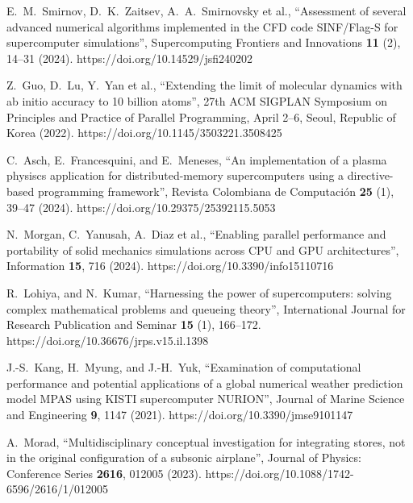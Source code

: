 \documentclass[
11pt,%
tightenlines,%
twoside,%
onecolumn,%
nofloats,%
nobibnotes,%
nofootinbib,%
superscriptaddress,%
noshowpacs,%
centertags]%
{revtex4}
\begin{document}
\begin{thebibliography}{99}

E.~M.~Smirnov, D.~K.~Zaitsev, A.~A.~Smirnovsky et al., \textquotedblleft Assessment of several advanced numerical algorithms implemented in the CFD code SINF/Flag-S for supercomputer simulations\textquotedblright, Supercomputing Frontiers and Innovations \textbf{11} (2), 14--31 (2024). https://doi.org/10.14529/jsfi240202

Z.~Guo, D.~Lu, Y.~Yan et al., \textquotedblleft Extending the limit of molecular dynamics with ab initio accuracy to 10 billion atoms\textquotedblright, 27th ACM SIGPLAN Symposium on Principles and Practice of Parallel Programming, April 2--6, Seoul, Republic of Korea (2022). https://doi.org/10.1145/3503221.3508425

C.~Asch, E.~Francesquini, and E.~Meneses, \textquotedblleft An implementation of a plasma physiscs application for distributed-memory supercomputers using a directive-based programming framework\textquotedblright, Revista Colombiana de Computaci\'on \textbf{25} (1), 39--47 (2024). https://doi.org/10.29375/25392115.5053

N.~Morgan, C.~Yanusah, A.~Diaz et al., \textquotedblleft Enabling parallel performance and portability of solid mechanics simulations across CPU and GPU architectures\textquotedblright, Information \textbf{15}, 716 (2024). https://doi.org/10.3390/info15110716

R.~Lohiya, and N.~Kumar, \textquotedblleft Harnessing the power of supercomputers: solving complex mathematical problems and queueing theory\textquotedblright, International Journal for Research Publication and Seminar \textbf{15} (1), 166--172. https://doi.org/10.36676/jrps.v15.il.1398

J.-S.~Kang, H.~Myung, and J.-H.~Yuk, \textquotedblleft Examination of computational performance and potential applications of a global numerical weather prediction model MPAS using KISTI supercomputer NURION\textquotedblright, Journal of Marine Science and Engineering \textbf{9}, 1147 (2021). https://doi.org/10.3390/jmse9101147

A.~Morad, \textquotedblleft Multidisciplinary conceptual investigation for integrating stores, not in the original configuration of a subsonic airplane\textquotedblright, Journal of Physics: Conference Series \textbf{2616}, 012005 (2023). https://doi.org/10.1088/1742-6596/2616/1/012005


\end{thebibliography}
\end{document}
